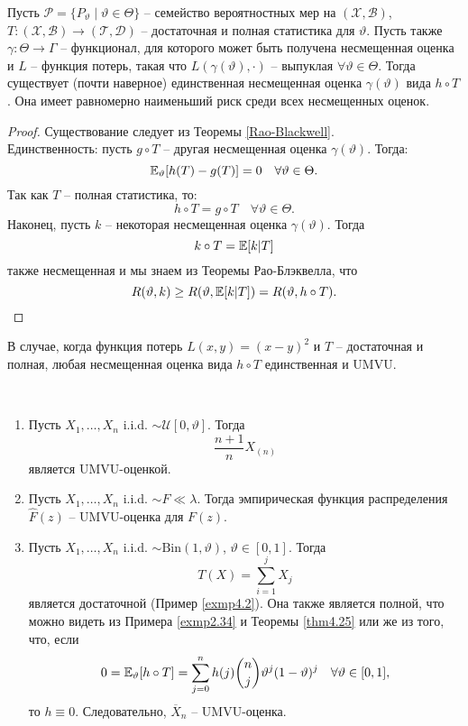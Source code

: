 \begin{thm} \label{Lehmann-Scheffe}
	Пусть $\mathcal{P}=\{ P_\vartheta \mid \vartheta \in \Theta \}$ -- семейство вероятностных мер на $(\mathcal{X},\mathcal{B})$, $T\colon(\mathcal{X},\mathcal{B}) \rightarrow (\mathcal{T},\mathcal{D})$ -- достаточная и полная статистика для $\vartheta$. Пусть также $\gamma\colon\Theta \rightarrow \Gamma$ -- функционал, для которого может быть получена несмещенная оценка и $L$ -- функция потерь, такая что $L(\gamma(\vartheta), \cdot)$ -- выпуклая $\forall \vartheta \in \Theta$. Тогда существует (почти наверное) единственная несмещенная оценка $\gamma(\vartheta)$ вида $h \circ T$. Она имеет равномерно наименьший риск среди всех несмещенных оценок.
\end{thm}
\begin{proof}
	Существование следует из Теоремы \ref{Rao-Blackwell}. \\
	Единственность: пусть $g \circ T$ -- другая несмещенная оценка $\gamma(\vartheta)$. Тогда:
	\[ \mathbb{E}_\vartheta[h(T)-g(T)]=0 \quad \forall \vartheta \in \Theta. \]
	Так как $T$ -- полная статистика, то:
	\[ h \circ T = g \circ T \quad \forall \vartheta \in \Theta. \]
	Наконец, пусть $k$ -- некоторая несмещенная оценка $\gamma(\vartheta)$. Тогда
	\[k \circ T = \mathbb{E}[k|T]\]
	также несмещенная и мы знаем из Теоремы Рао-Блэквелла, что
	\[ R(\vartheta, k) \geq R(\vartheta, \mathbb{E}[k|T])=R(\vartheta, h \circ T). \]
\end{proof}

\begin{crlr}
	В случае, когда функция потерь $L(x,y)=(x-y)^2$ и $T$ -- достаточная и полная, любая несмещенная оценка вида $h \circ T$ единственная и UMVU.
\end{crlr}

\begin{exmp} \label{exmp4.30} \
	\begin{enumerate}
		\item Пусть $X_1, \dots, X_n$ i.i.d. $\sim \mathcal{U}[0,\vartheta]$. Тогда
		\[ \frac{n+1}{n}X_{(n)} \]
		является UMVU-оценкой.
		\item Пусть $X_1, \dots, X_n$ i.i.d. $\sim F \ll \lambda$. Тогда эмпирическая функция распределения $\hat{F}(z)$ -- UMVU-оценка для $F(z)$.
		\item Пусть $X_1, \dots, X_n$ i.i.d. $\sim \mathrm{Bin}(1,\vartheta)$, $\vartheta \in [0, 1]$. Тогда
		\[ T(X)=\sum_{i=1}^{j}X_j \]
		является достаточной (Пример \ref{exmp4.2}). Она также является полной, что можно видеть из Примера \ref{exmp2.34} и Теоремы \ref{thm4.25} или же из того, что, если
		\[ 0 = \mathbb{E}_\vartheta[h \circ T]=\sum_{j=0}^{n}h(j)\binom{n}{j}\vartheta^j(1-\vartheta)^j \quad \forall \vartheta \in [0, 1], \]
		то $h \equiv 0$. Следовательно, $\overline{X}_n$ -- UMVU-оценка.
	\end{enumerate}
\end{exmp}

